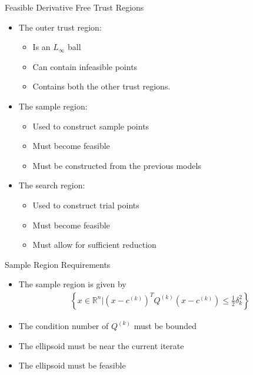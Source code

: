 \documentclass{beamer}
\newcommand{\Rn}{\mathbb R ^ {n}}
\begin{document}
\begin{frame}{Feasible Derivative Free Trust Regions}
	\begin{itemize}
		\item The outer trust region:
			\begin{itemize}
				\item Is an $L_{\infty}$ ball
				\item Can contain infeasible points
				\item Contains both the other trust regions.
			\end{itemize}
		\item The sample region:
			\begin{itemize}
				\item Used to construct sample points
				\item Must become feasible
				\item Must be constructed from the previous models
			\end{itemize}
		\item The search region:
			\begin{itemize}
				\item Used to construct trial points
				\item Must become feasible
				\item Must allow for sufficient reduction
			\end{itemize}
	\end{itemize}
\end{frame}


\begin{frame}{Sample Region Requirements}
	\begin{itemize}
		\setlength\itemsep{1.5em}
		\item The sample region is given by
\begin{align*}
\left\{x \in \Rn \bigg | \left(x - c^{(k)}\right)^TQ^{(k)}\left(x - c^{(k)}\right) \le \frac 1 2 \delta_k^2 \right\}
\end{align*}
		\item The condition number of $Q^{(k)}$ must be bounded
		\item The ellipsoid must be near the current iterate
		\item The ellipsoid must be feasible
	\end{itemize}
\end{frame}
\end{document}
